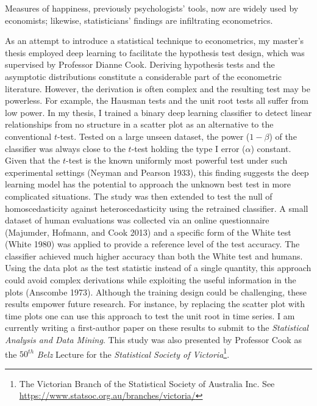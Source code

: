 \documentclass[12pt,]{article}
\let\rmarkdownfootnote\footnote%
\def\footnote{\protect\rmarkdownfootnote}
\begin{document}
Measures of happiness, previously psychologists' tools, now are widely
used by economists; likewise, statisticians' findings are infiltrating
econometrics.

As an attempt to introduce a statistical technique to econometrics, my
master's thesis employed deep learning to facilitate the hypothesis test
design, which was supervised by Professor Dianne Cook. Deriving
hypothesis tests and the asymptotic distributions constitute a
considerable part of the econometric literature. However, the derivation
is often complex and the resulting test may be powerless. For example,
the Hausman tests and the unit root tests all suffer from low power. In
my thesis, I trained a binary deep learning classifier to detect linear
relationships from no structure in a scatter plot as an alternative to
the conventional \(t\)-test. Tested on a large unseen dataset, the power
(\(1-\beta\)) of the classifier was always close to the \(t\)-test
holding the type I error (\(\alpha\)) constant. Given that the
\(t\)-test is the known uniformly most powerful test under such
experimental settings (Neyman and Pearson 1933), this finding suggests
the deep learning model has the potential to approach the unknown best
test in more complicated situations. The study was then extended to test
the null of homoscedasticity against heteroscedasticity using the
retrained classifier. A small dataset of human evaluations was collected
via an online questionnaire (Majumder, Hofmann, and Cook 2013) and a
specific form of the White test (White 1980) was applied to provide a
reference level of the test accuracy. The classifier achieved much
higher accuracy than both the White test and humans. Using the data plot
as the test statistic instead of a single quantity, this approach could
avoid complex derivations while exploiting the useful information in the
plots (Anscombe 1973). Although the training design could be
challenging, these results empower future research. For instance, by
replacing the scatter plot with time plots one can use this approach to
test the unit root in time series. I am currently writing a first-author
paper on these results to submit to the \emph{Statistical Analysis and
Data Mining}. This study was also presented by Professor Cook as the
\(50^{th}\) \emph{Belz} Lecture for the \emph{Statistical Society of
Victoria}\footnote{The Victorian Branch of the Statistical Society of
  Australia Inc. See \url{https://www.statsoc.org.au/branches/victoria/}}.
\end{document}
